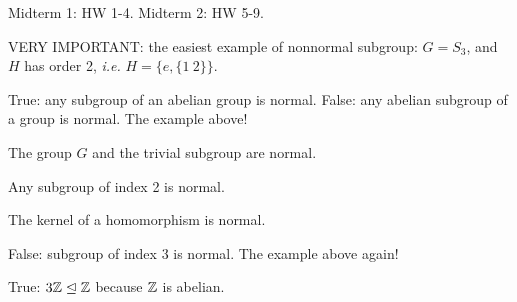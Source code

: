 \documentclass[class=article,crop=false]{standalone}
\begin{document}
Midterm 1: HW 1-4. Midterm 2: HW 5-9.

VERY IMPORTANT: the easiest example of nonnormal subgroup: $ G=S_3$, and $ H$ has order 2,  \emph{i.e.} $ H= \{e, \{1\ 2\} \} $.

True: any subgroup of an abelian group is normal.
False: any abelian subgroup of a group is normal. The example above!

The group $ G$ and the trivial subgroup are normal.

Any subgroup of index 2 is normal.

The kernel of a homomorphism is normal.

False: subgroup of index 3 is normal. The example above again!

True: $ 3 \mathbb{Z} \trianglelefteq \mathbb{Z}$ because $ \mathbb{Z}$ is abelian.
\end{document}
